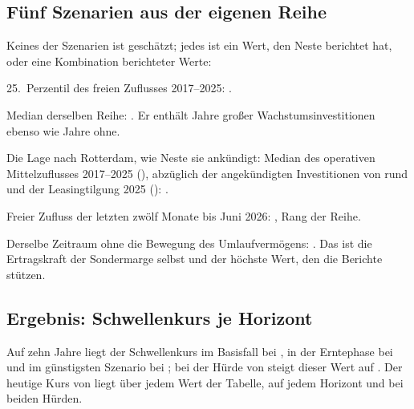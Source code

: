 \subsection{F\"unf Szenarien aus der eigenen Reihe}

Keines der Szenarien ist gesch\"atzt; jedes ist ein Wert, den Neste berichtet hat, oder eine
Kombination berichteter Werte:

\begin{description}\small
\item[pessimistisch] 25.~Perzentil des freien Zuflusses 2017--2025: .
\item[Basis] Median derselben Reihe: . Er enth\"alt Jahre gro{\ss}er
  Wachstumsinvestitionen ebenso wie Jahre ohne.
\item[Erntephase] Die Lage nach Rotterdam, wie Neste sie ank\"undigt: Median des operativen
  Mittelzuflusses 2017--2025 (), abz\"uglich der angek\"undigten
  Investitionen von rund  und der
  Leasingtilgung 2025 (): .
\item[LTM] Freier Zufluss der letzten zw\"olf Monate bis Juni 2026: ,
  Rang \Pz{\FcfRangLtm} der Reihe.
\item[LTM ohne Umlaufverm\"ogen] Derselbe Zeitraum ohne die Bewegung des Umlaufverm\"ogens:
  . Das ist die Ertragskraft der Sondermarge selbst und der h\"ochste
  Wert, den die Berichte stützen.
\end{description}


\subsection{Ergebnis: Schwellenkurs je Horizont}

\schwellentabelle

Auf zehn Jahre liegt der Schwellenkurs im Basisfall bei , in der
Erntephase bei  und im g\"unstigsten Szenario bei
; bei der H\"urde von \Pz{\HuerdeLang} steigt dieser Wert auf
. Der heutige Kurs von  liegt \"uber jedem Wert
der Tabelle, auf jedem Horizont und bei beiden H\"urden.

